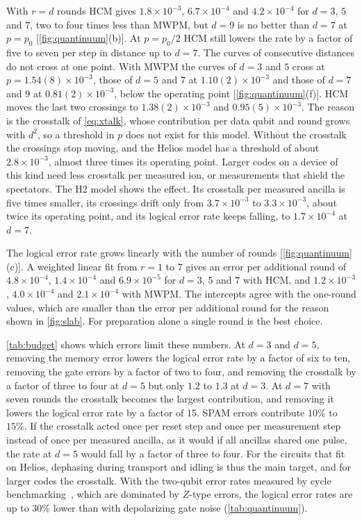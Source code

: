 With $r=d$ rounds HCM gives $1.8\times10^{-3}$, $6.7\times10^{-4}$ and $4.2\times10^{-4}$ for $d=3$, $5$ and $7$, two to four times less than MWPM, but $d=9$ is no better than $d=7$ at $p=p_0$ [\autoref{fig:quantinuum}(b)]. At $p=p_0/2$ HCM still lowers the rate by a factor of five to seven per step in distance up to $d=7$. The curves of consecutive distances do not cross at one point. With MWPM the curves of $d=3$ and $5$ cross at $p=1.54(8)\times10^{-3}$, those of $d=5$ and $7$ at $1.10(2)\times10^{-3}$ and those of $d=7$ and $9$ at $0.81(2)\times10^{-3}$, below the operating point [\autoref{fig:quantinuum}(f)]. HCM moves the last two crossings to $1.38(2)\times10^{-3}$ and $0.95(5)\times10^{-3}$. The reason is the crosstalk of \autoref{eq:xtalk}, whose contribution per data qubit and round grows with $d^2$, so a threshold in $p$ does not exist for this model. Without the crosstalk the crossings stop moving, and the Helios model has a threshold of about $2.8\times10^{-3}$, almost three times its operating point. Larger codes on a device of this kind need less crosstalk per measured ion, or measurements that shield the spectators. The H2 model shows the effect. Its crosstalk per measured ancilla is five times smaller, its crossings drift only from $3.7\times10^{-3}$ to $3.3\times10^{-3}$, about twice its operating point, and its logical error rate keeps falling, to $1.7\times10^{-4}$ at $d=7$.

The logical error rate grows linearly with the number of rounds [\autoref{fig:quantinuum}(c)]. A weighted linear fit from $r=1$ to $7$ gives an error per additional round of $4.8\times10^{-4}$, $1.4\times10^{-4}$ and $6.9\times10^{-5}$ for $d=3$, $5$ and $7$ with HCM, and $1.2\times10^{-3}$, $4.0\times10^{-4}$ and $2.1\times10^{-4}$ with MWPM. The intercepts agree with the one-round values, which are smaller than the error per additional round for the reason shown in \autoref{fig:slab}. For preparation alone a single round is the best choice.

\autoref{tab:budget} shows which errors limit these numbers. At $d=3$ and $d=5$, removing the memory error lowers the logical error rate by a factor of six to ten, removing the gate errors by a factor of two to four, and removing the crosstalk by a factor of three to four at $d=5$ but only $1.2$ to $1.3$ at $d=3$. At $d=7$ with seven rounds the crosstalk becomes the largest contribution, and removing it lowers the logical error rate by a factor of 15. SPAM errors contribute $10\%$ to $15\%$. If the crosstalk acted once per reset step and once per measurement step instead of once per measured ancilla, as it would if all ancillas shared one pulse, the rate at $d=5$ would fall by a factor of three to four. For the circuits that fit on Helios, dephasing during transport and idling is thus the main target, and for larger codes the crosstalk. With the two-qubit error rates measured by cycle benchmarking~\cite{ransford2026}, which are dominated by $Z$-type errors, the logical error rates are up to $30\%$ lower than with depolarizing gate noise (\autoref{tab:quantinuum}).

